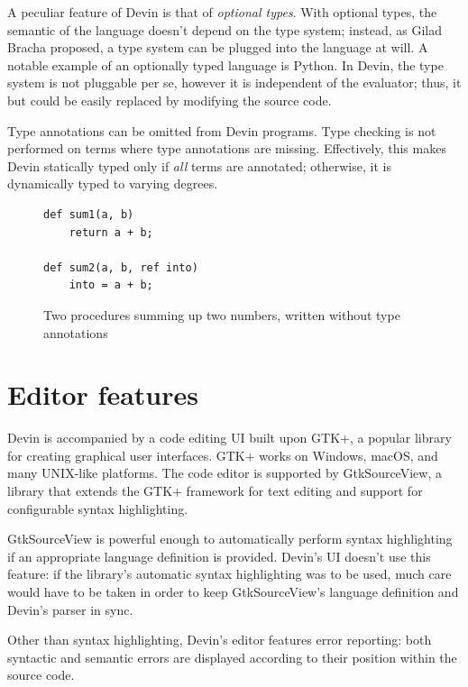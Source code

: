 \documentclass[11pt, american, draft]{PhdThesis}
\begin{document}
  A peculiar feature of Devin is that of \emph{optional types}. With optional types, the semantic of
  the language doesn't depend on the type system; instead, as Gilad Bracha proposed\cite{bracha}, a
  type system can be plugged into the language at will. A notable example of an optionally typed
  language is Python. In Devin, the type system is not pluggable per se, however it is independent
  of the evaluator; thus, it but could be easily replaced by modifying the source code.

  Type annotations can be omitted from Devin programs. Type checking is not performed on terms where
  type annotations are missing. Effectively, this makes Devin statically typed only if \emph{all}
  terms are annotated; otherwise, it is dynamically typed to varying degrees.

  \begin{figure}[H]
    \center

\begin{verbatim}
def sum1(a, b)
    return a + b;

def sum2(a, b, ref into)
    into = a + b;
\end{verbatim}

    \caption{Two procedures summing up two numbers, written without type annotations}
  \end{figure}

  \section{Editor features}

  Devin is accompanied by a code editing UI built upon GTK+, a popular library for creating
  graphical user interfaces. GTK+ works on Windows, macOS, and many UNIX-like platforms\cite{gtk+}.
  The code editor is supported by GtkSourceView, a library that extends the GTK+ framework for text
  editing and support for configurable syntax highlighting\cite{gtksourceview}.

  GtkSourceView is powerful enough to automatically perform syntax highlighting if an appropriate
  language definition is provided. Devin's UI doesn't use this feature: if the library's automatic
  syntax highlighting was to be used, much care would have to be taken in order to keep
  GtkSourceView's language definition and Devin's parser in sync.

  Other than syntax highlighting, Devin's editor features error reporting: both syntactic and
  semantic errors are displayed according to their position within the source code.
\end{document}
